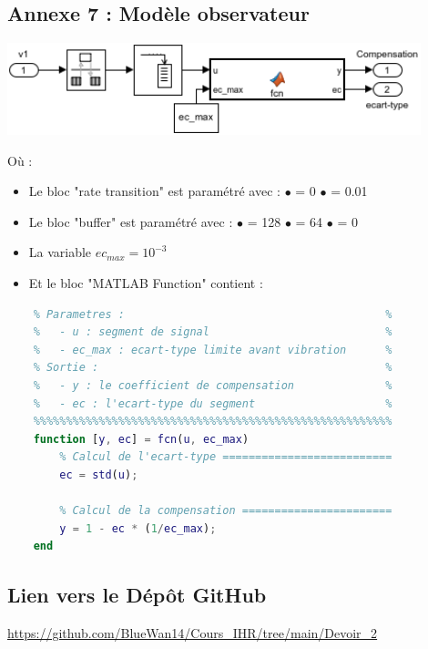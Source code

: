 \documentclass[a4paper,12pt]{article}
\begin{document}
    \subsection{Annexe 7 : Modèle observateur} \label{Annexe:modelObs}
    \begin{center}
        \includegraphics[width=12cm]{./img/model_observateur.png}
    \end{center}
    Où :
    \begin{itemize}
        \item[] Le bloc "rate transition" est paramétré avec : 
            \subitem $\bullet$  = 0
            \subitem $\bullet$  = 0.01
        \item[] Le bloc "buffer" est paramétré avec : 
            \subitem$\bullet$  = 128
            \subitem$\bullet$  = 64
            \subitem$\bullet$  = 0
        \item[] La variable $ec_{max} = 10^{-3}$
        \item[] Et le bloc "MATLAB Function" contient :
    \end{itemize}
    \begin{lstlisting}[caption={Fonction simulink de calcul du compensateur}, language=Matlab]
    %%%%%%%%%%%%%%%%%%%%%%%%%%%%%%%%%%%%%%%%%%%%%%%%%%%%%%%
    % Parametres :                                        %
    %   - u : segment de signal                           %
    %   - ec_max : ecart-type limite avant vibration      %
    % Sortie :                                            %
    %   - y : le coefficient de compensation              %
    %   - ec : l'ecart-type du segment                    %
    %%%%%%%%%%%%%%%%%%%%%%%%%%%%%%%%%%%%%%%%%%%%%%%%%%%%%%%
    function [y, ec] = fcn(u, ec_max)
        % Calcul de l'ecart-type ==========================
        ec = std(u);

        % Calcul de la compensation =======================
        y = 1 - ec * (1/ec_max);
    end
    \end{lstlisting}
    
    
    \subsection{Lien vers le Dépôt GitHub}
    \url{https://github.com/BlueWan14/Cours_IHR/tree/main/Devoir_2}
    
\end{document}
